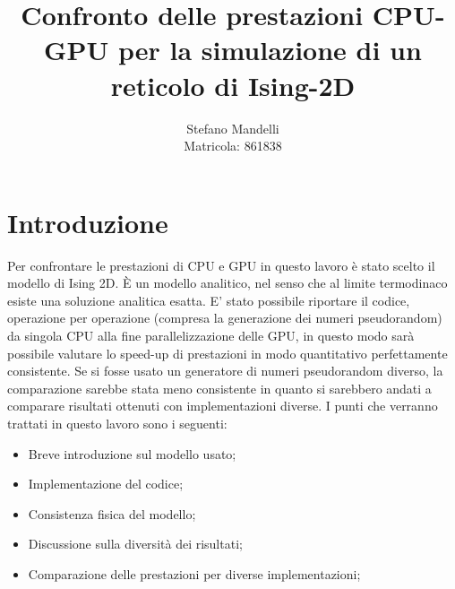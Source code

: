 \documentclass[a4paper,12pt]{article}
\begin{document}
\author{Stefano Mandelli\\
Matricola: 861838}
\title{\bf \Huge Confronto delle prestazioni CPU-GPU per la simulazione di un reticolo di Ising-2D}
\date{}
\maketitle
\section*{Introduzione}
Per confrontare le prestazioni di CPU e GPU in questo lavoro è stato scelto il modello di Ising 2D. \`E un modello analitico, nel senso che al limite termodinaco esiste una soluzione analitica esatta. E' stato possibile riportare il codice, operazione per operazione (compresa la generazione dei numeri pseudorandom) da singola CPU alla fine parallelizzazione delle GPU, in questo modo sarà possibile valutare lo speed-up di prestazioni in modo quantitativo perfettamente consistente. Se si fosse usato un generatore di numeri pseudorandom diverso, la comparazione sarebbe stata meno consistente in quanto si sarebbero andati a comparare risultati ottenuti con implementazioni diverse. I punti che verranno trattati in questo lavoro sono i seguenti:
\begin{itemize}
	\item Breve introduzione sul modello usato;
	\item Implementazione del codice;
	\item Consistenza fisica del modello;
	\item Discussione sulla diversità dei risultati;
	\item Comparazione delle prestazioni per diverse implementazioni;
\end{itemize}
\end{document}
